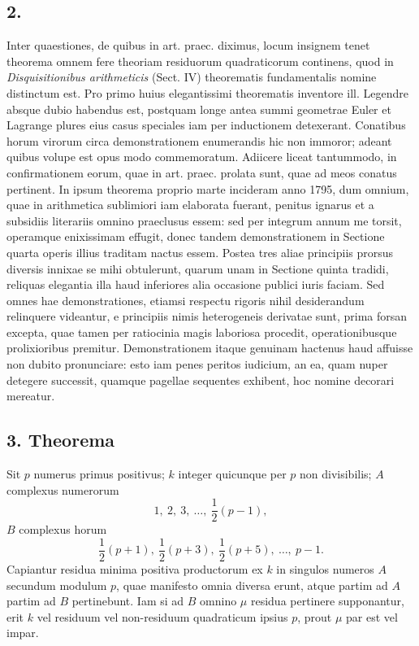 \documentclass[12pt]{article}
\begin{document}
\subsection*{2.}

Inter quaestiones, de quibus in art. praec. diximus, locum insignem tenet theorema omnem fere theoriam residuorum quadraticorum continens, quod in \emph{Disquisitionibus arithmeticis} (Sect. IV) theorematis fundamentalis nomine distinctum est. Pro primo huius elegantissimi theorematis inventore ill. Legendre absque dubio habendus est, postquam longe antea summi geometrae Euler et Lagrange plures eius casus speciales iam per inductionem detexerant. Conatibus horum virorum circa demonstrationem enumerandis hic non immoror; adeant quibus volupe est opus modo commemoratum. Adiicere liceat tantummodo, in confirmationem eorum, quae in art. praec. prolata sunt, quae ad meos conatus pertinent. In ipsum theorema proprio marte incideram anno 1795, dum omnium, quae in arithmetica sublimiori iam elaborata fuerant, penitus ignarus et a subsidiis literariis omnino praeclusus essem: sed per integrum annum me torsit, operamque enixissimam effugit, donec tandem demonstrationem in Sectione quarta operis illius traditam nactus essem. Postea tres aliae principiis prorsus diversis innixae se mihi obtulerunt, quarum unam in Sectione quinta tradidi, reliquas elegantia illa haud inferiores alia occasione publici iuris faciam. Sed omnes hae demonstrationes, etiamsi respectu rigoris nihil desiderandum relinquere videantur, e principiis nimis heterogeneis derivatae sunt, prima forsan excepta, quae tamen per ratiocinia magis laboriosa procedit, operationibusque prolixioribus premitur. Demonstrationem itaque genuinam hactenus haud affuisse non dubito pronunciare: esto iam penes peritos iudicium, an ea, quam nuper detegere successit, quamque pagellae sequentes exhibent, hoc nomine decorari mereatur.

\subsection*{3. Theorema}

Sit $p$ numerus primus positivus; $k$ integer quicunque per $p$ non divisibilis; $A$ complexus numerorum
\[
1,\ 2,\ 3,\ \ldots,\ \frac12(p-1),
\]
$B$ complexus horum
\[
\frac12(p+1),\ \frac12(p+3),\ \frac12(p+5),\ \ldots,\ p-1.
\]
Capiantur residua minima positiva productorum ex $k$ in singulos numeros $A$ secundum modulum $p$, quae manifesto omnia diversa erunt, atque partim ad $A$ partim ad $B$ pertinebunt. Iam si ad $B$ omnino $\mu$ residua pertinere supponantur, erit $k$ vel residuum vel non-residuum quadraticum ipsius $p$, prout $\mu$ par est vel impar.
\end{document}
